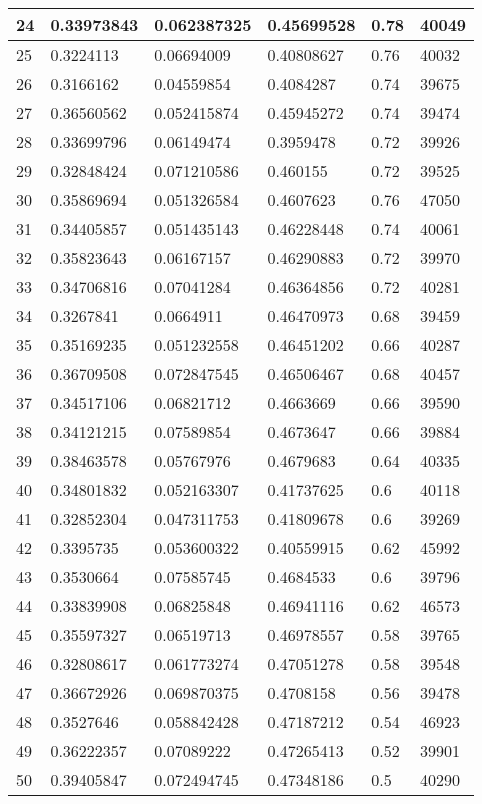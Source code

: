 \begin{longtable}{|l|l|l|l|l|l|}
24 & 0.33973843 & 0.062387325 & 0.45699528 & 0.78 & 40049 \\ \hline 
25 & 0.3224113 & 0.06694009 & 0.40808627 & 0.76 & 40032 \\ \hline 
26 & 0.3166162 & 0.04559854 & 0.4084287 & 0.74 & 39675 \\ \hline 
27 & 0.36560562 & 0.052415874 & 0.45945272 & 0.74 & 39474 \\ \hline 
28 & 0.33699796 & 0.06149474 & 0.3959478 & 0.72 & 39926 \\ \hline 
29 & 0.32848424 & 0.071210586 & 0.460155 & 0.72 & 39525 \\ \hline 
30 & 0.35869694 & 0.051326584 & 0.4607623 & 0.76 & 47050 \\ \hline 
31 & 0.34405857 & 0.051435143 & 0.46228448 & 0.74 & 40061 \\ \hline 
32 & 0.35823643 & 0.06167157 & 0.46290883 & 0.72 & 39970 \\ \hline 
33 & 0.34706816 & 0.07041284 & 0.46364856 & 0.72 & 40281 \\ \hline 
34 & 0.3267841 & 0.0664911 & 0.46470973 & 0.68 & 39459 \\ \hline 
35 & 0.35169235 & 0.051232558 & 0.46451202 & 0.66 & 40287 \\ \hline 
36 & 0.36709508 & 0.072847545 & 0.46506467 & 0.68 & 40457 \\ \hline 
37 & 0.34517106 & 0.06821712 & 0.4663669 & 0.66 & 39590 \\ \hline 
38 & 0.34121215 & 0.07589854 & 0.4673647 & 0.66 & 39884 \\ \hline 
39 & 0.38463578 & 0.05767976 & 0.4679683 & 0.64 & 40335 \\ \hline 
40 & 0.34801832 & 0.052163307 & 0.41737625 & 0.6 & 40118 \\ \hline 
41 & 0.32852304 & 0.047311753 & 0.41809678 & 0.6 & 39269 \\ \hline 
42 & 0.3395735 & 0.053600322 & 0.40559915 & 0.62 & 45992 \\ \hline 
43 & 0.3530664 & 0.07585745 & 0.4684533 & 0.6 & 39796 \\ \hline 
44 & 0.33839908 & 0.06825848 & 0.46941116 & 0.62 & 46573 \\ \hline 
45 & 0.35597327 & 0.06519713 & 0.46978557 & 0.58 & 39765 \\ \hline 
46 & 0.32808617 & 0.061773274 & 0.47051278 & 0.58 & 39548 \\ \hline 
47 & 0.36672926 & 0.069870375 & 0.4708158 & 0.56 & 39478 \\ \hline 
48 & 0.3527646 & 0.058842428 & 0.47187212 & 0.54 & 46923 \\ \hline 
49 & 0.36222357 & 0.07089222 & 0.47265413 & 0.52 & 39901 \\ \hline 
50 & 0.39405847 & 0.072494745 & 0.47348186 & 0.5 & 40290 \\ \hline 
\end{longtable}